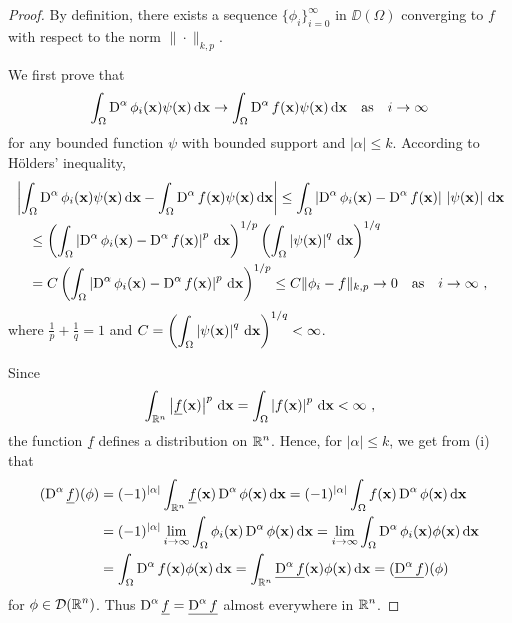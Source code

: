 \begin{proof}
By definition, there exists a sequence
$\displaystyle \{\phi_i\}_{i=0}^\infty$ in
$\DD(\Omega)$ converging to $f$ with respect to the norm
$\|\cdot\|_{k,p}$.

 We first prove that
\[
\int_\Omega \operatorname{D}^\alpha \phi_i(\mathbf{x}) \psi(\mathbf{x}) \,\mathrm{d}{\mathbf{x}}
\rightarrow \int_\Omega \operatorname{D}^\alpha f(\mathbf{x}) \psi(\mathbf{x}) \,\mathrm{d}{\mathbf{x}}
\quad \text{as}\quad i \rightarrow \infty
\]
for any bounded function $\psi$ with bounded support and $|\alpha|\leq k$.
According to Hölders' inequality,
\begin{align*}
&\left|\int_\Omega \operatorname{D}^\alpha \phi_i(\mathbf{x}) \psi(\mathbf{x}) \,\mathrm{d}{\mathbf{x}}
- \int_\Omega \operatorname{D}^\alpha f(\mathbf{x}) \psi(\mathbf{x}) \,\mathrm{d}{\mathbf{x}}\right|
\leq  \int_\Omega \left| \operatorname{D}^\alpha \phi_i(\mathbf{x}) -
\operatorname{D}^\alpha f(\mathbf{x})\right|\,
\left| \psi(\mathbf{x}) \right| \,\mathrm{d}{\mathbf{x}} \\
&\quad \leq \left( \int_\Omega \left| \operatorname{D}^\alpha \phi_i(\mathbf{x})
- \operatorname{D}^\alpha f(\mathbf{x})\right|^p
\,\mathrm{d}{\mathbf{x}} \right)^{1/p} \left(
\int_\Omega \left| \psi(\mathbf{x}) \right|^q \,\mathrm{d}{\mathbf{x}} \right)^{1/q} \\
&\quad = C \left( \int_\Omega \left| \operatorname{D}^\alpha \phi_i(\mathbf{x})
- \operatorname{D}^\alpha f(\mathbf{x})\right|^p \,\mathrm{d}{\mathbf{x}} \right)^{1/p}
\leq C \| \phi_i - f \|_{k,p} \rightarrow 0 \quad \text{as} \quad
i\rightarrow \infty \ ,
\end{align*}
where $\displaystyle \frac{1}{p}+ \frac{1}{q} = 1$ and
$\displaystyle C = \left(
\int_\Omega \left| \psi(\mathbf{x}) \right|^q \,\mathrm{d}{\mathbf{x}} \right)^{1/q}
< \infty$.

 Since
\[
\int_{\RR^n} \left|\underline{f}(\VEC{x})\right|^p \dx{\VEC{x}} = 
\int_{\Omega} \left| f(\VEC{x}) \right|^p \dx{\VEC{x}} < \infty \ ,
\]
the function $\underline{f}$ defines a distribution on $\displaystyle \mathbb{R}^n$.
Hence, for $|\alpha|\leq k$, we get from (i) that
\begin{align*}
(\operatorname{D}^\alpha \underline{f})(\phi)
&= (-1)^{|\alpha|} \int_{\mathbb{R}^n} \underline{f}(\mathbf{x})
\operatorname{D}^\alpha \phi(\mathbf{x})\,\mathrm{d}{\mathbf{x}}
= (-1)^{|\alpha|} \int_{\Omega} f(\mathbf{x})
\operatorname{D}^\alpha \phi(\mathbf{x})\,\mathrm{d}{\mathbf{x}} \\
&= (-1)^{|\alpha|} \lim_{i\rightarrow \infty}
\int_{\Omega} \phi_i(\mathbf{x}) \operatorname{D}^\alpha \phi(\mathbf{x})\,\mathrm{d}{\mathbf{x}}
= \lim_{i\rightarrow \infty}
\int_{\Omega} \operatorname{D}^\alpha \phi_i(\mathbf{x}) \phi(\mathbf{x})\,\mathrm{d}{\mathbf{x}} \\
&= \int_{\Omega} \operatorname{D}^\alpha f(\mathbf{x}) \phi(\mathbf{x})\,\mathrm{d}{\mathbf{x}}
= \int_{\mathbb{R}^n} \underline{\operatorname{D}^\alpha f}(\mathbf{x}) \phi(\mathbf{x})\,\mathrm{d}{\mathbf{x}}
= (\underline{\operatorname{D}^\alpha f}) (\phi)
\end{align*}
for $\displaystyle \phi \in \mathcal{D}(\mathbb{R}^n)$.
Thus $\displaystyle \operatorname{D}^\alpha \underline{f} = \underline{\operatorname{D}^\alpha f}$
almost everywhere in $\displaystyle \mathbb{R}^n$.


\end{proof}

